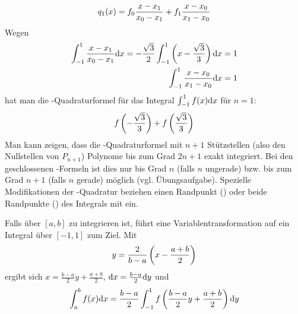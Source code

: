 \begin{align}
	q_1(x) = f_0\frac{x-x_1}{x_0-x_1}+f_1\frac{x-x_0}{x_1-x_0}\notag
\end{align}
Wegen
\begin{align}
	\int_{-1}^1 \frac{x-x_1}{x_0-x_1}\mathrm{d} x = -\frac{\sqrt{3}}{2}\int_{-1}^1 \left(x-\frac{\sqrt{3}}{3}\right)\mathrm{d} x&=1 \notag \\
	\int_{-1}^1 \frac{x-x_0}{x_1-x_0}\mathrm{d} x &= 1\notag
\end{align}
hat man die -Quadraturformel für das Integral $\int_{-1}^1 f(x)\mathrm{d} x$ für $n=1$:
\begin{align}
	f\left(-\frac{\sqrt{3}}{3}\right) + f\left(\frac{\sqrt{3}}{3}\right)\notag
\end{align}
Man kann zeigen, dass die -Quadraturformel  mit $n+1$ Stützstellen (also den Nullstellen von $P_{n+1}$) Polynome bis zum Grad $2n+1$ exakt integriert. Bei den geschlossenen -Formeln ist dies nur bis Grad $n$ (falls $n$ ungerade) bzw. bis zum Grad $n+1$ (falls $n$ gerade) möglich (vgl. Übungsaufgabe). Spezielle Modifikationen der -Quadratur beziehen einen Randpunkt () oder beide Randpunkte () des Integrals mit ein.

Falls über $[a,b]$ zu integrieren ist, führt eine Variablentransformation auf ein Integral über $[-1,1]$ zum Ziel. Mit
\begin{align}
	y=\frac{2}{b-a}\left(x-\frac{a+b}{2}\right)\notag
\end{align}
ergibt sich $x=\frac{b-a}{2}y+\frac{a+b}{2}$, $\mathrm{d} x=\frac{b-a}{2}\mathrm{d} y$ und
\begin{align}
	\int_a^b f(x)\mathrm{d} x = \frac{b-a}{2}\int_{-1}^1 f\left(\frac{b-a}{2}y+\frac{a+b}{2}\right)\mathrm{d} y\notag
\end{align}